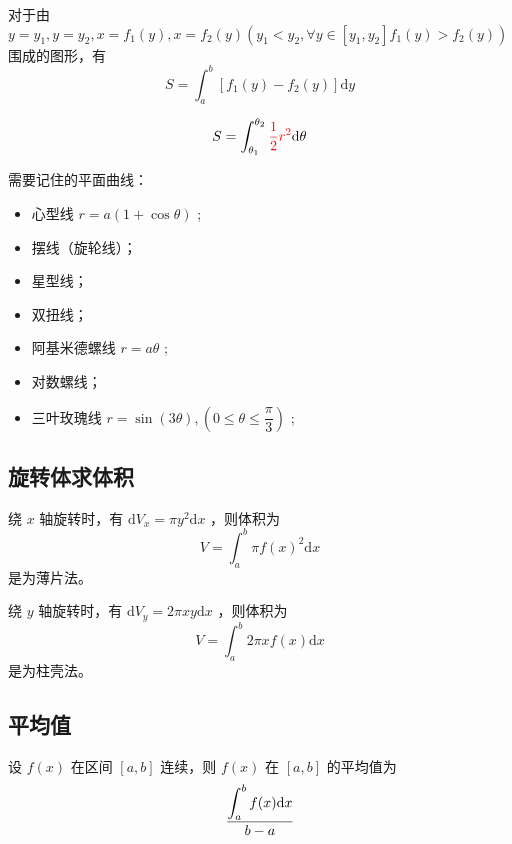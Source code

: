 对于由 $ y = y_1, y = y_2,x = f_1(y), x = f_2(y) (y_1 < y_2,\forall y \in [y_1,y_2]f_1(y) > f_2(y)) $ 
围成的图形，有 $$
    S = \int_a^b[f_1(y)-f_2(y)]\mathrm{d}y
$$ 


$$
    S = \int_{\theta_1}^{\theta_2}\textcolor{red}{\dfrac{1}{2}r^2}\mathrm{d}\theta
$$ 

需要记住的平面曲线：
\begin{itemize}
    \item 心型线 $ r = a(1+\cos\theta) $ ;
    \item 摆线（旋轮线）；
    \item 星型线；
    \item 双扭线；
    \item 阿基米德螺线 $ r = a\theta $ ;
    \item 对数螺线；
    \item 三叶玫瑰线 $ r = \sin(3\theta),(0\leq\theta\leq \dfrac{\pi}{3}) $ ;
\end{itemize}

\subsection{旋转体求体积}

绕 $ x $ 轴旋转时，有 $ \mathrm{d}V_x = \pi y^2 \mathrm{d}x $ ，则体积为$$
    V = \int_a^b \pi f(x)^2 \mathrm{d}x
$$ 
是为薄片法。

绕 $ y $ 轴旋转时，有 $ \mathrm{d}V_y = 2\pi xy \mathrm{d} x $ ，则体积为$$
    V = \int_a^b 2\pi xf(x)\mathrm{d}x
$$ 
是为柱壳法。

\subsection{平均值}

设 $ f(x) $ 在区间 $ [a,b] $ 连续，则 $ f(x) $ 在 $ [a,b] $ 的平均值为
$$
    \dfrac{\displaystyle \int_a^b f(x)\mathrm{d}x}{b-a}
$$ 

